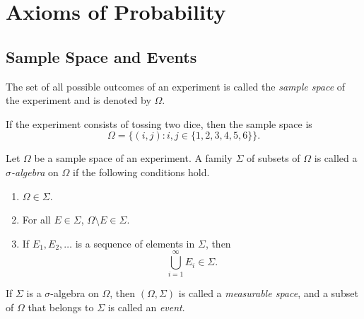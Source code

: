 \chapter{Axioms of Probability}
\section{Sample Space and Events}
\begin{definition}
  The set of all possible outcomes of an experiment is called the
  \emph{sample space} of the experiment and is denoted by $\Omega$.
\end{definition}
\begin{example}
  If the experiment consists of tossing two dice, then the sample space is
  \begin{equation*}
    \Omega = \{ (i, j): i, j \in \{1, 2, 3, 4, 5, 6\} \}.
  \end{equation*}
\end{example}

\begin{definition}
  Let $\Omega$ be a sample space of an experiment.
  A family $\Sigma$ of subsets of $\Omega$ is called a
  \emph{$\sigma$-algebra} on $\Omega$ if the following conditions hold.
  \begin{enumerate}
    \item $\Omega \in \Sigma$.
    \item For all $E \in \Sigma$,
      $\Omega \setminus E \in \Sigma$.
    \item If $E_1, E_2, \dots$ is a sequence of elements in $\Sigma$, then
      \begin{equation*}
        \bigcup_{i=1}^\infty E_i \in \Sigma.
      \end{equation*}
  \end{enumerate}
\end{definition}

\begin{definition}
  If $\Sigma$ is a $\sigma$-algebra on $\Omega$, then $(\Omega, \Sigma)$ is
  called a \emph{measurable space}, and a subset of $\Omega$ that belongs to
  $\Sigma$ is called an \emph{event}.
\end{definition}

